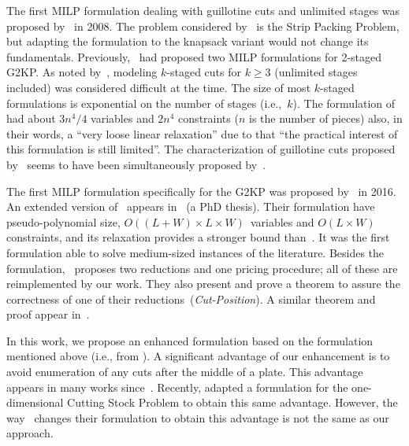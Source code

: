 \documentclass[smallextended]{svjour3}       %
\begin{document}
The first MILP formulation dealing with guillotine cuts and unlimited stages was proposed by~\cite{messaoud:2008} in 2008.
The problem considered by~\cite{messaoud:2008} is the Strip Packing Problem, but adapting the formulation to the knapsack variant would not change its fundamentals.
Previously, \cite{lodi:2003}~had proposed two MILP formulations for 2-staged G2KP.
As noted by~\cite{belov_thesis:2003}, modeling \(k\)-staged cuts for \(k \geq 3\) (unlimited stages included) was considered difficult at the time.
The size of most \(k\)-staged formulations is exponential on the number of stages (i.e.,~\(k\)).
The formulation of~\cite{messaoud:2008} had about \(3n^4/4\) variables and \(2n^4\) constraints (\(n\) is the number of pieces) also, in their words, a ``very loose linear relaxation'' due to that ``the practical interest of this formulation is still limited''.
The characterization of guillotine cuts proposed by~\cite{messaoud:2008} seems to have been simultaneously proposed by~\cite{pisinger:2007}. %

The first MILP formulation specifically for the G2KP was proposed by~\cite{furini:2016} in 2016.
An extended version of~\cite{furini:2016} appears in~\cite{dimitri_thesis} (a PhD thesis).
Their formulation have pseudo-polynomial size, \(O((L + W) \times L \times W)\)~variables and \(O(L \times W)\) constraints, and its relaxation provides a stronger bound than~\cite{messaoud:2008}.
It was the first formulation able to solve medium-sized instances of the literature.
Besides the formulation, \cite{furini:2016}~proposes two reductions and one pricing procedure; all of these are reimplemented by our work.
They also present and prove a theorem to assure the correctness of one of their reductions~(\emph{Cut-Position}).
A similar theorem and proof appear in~\cite{song:2010}.

In this work, we propose an enhanced formulation based on the formulation mentioned above (i.e., from \cite{furini:2016}).
A significant advantage of our enhancement is to avoid enumeration of any cuts after the middle of a plate.
This advantage appears in many works since~\cite{herz:1972}.
Recently, \cite{delorme:2019} adapted a formulation for the one-dimensional Cutting Stock Problem to obtain this same advantage.
However, the way \cite{delorme:2019}~changes their formulation to obtain this advantage is not the same as our approach.
\end{document}
